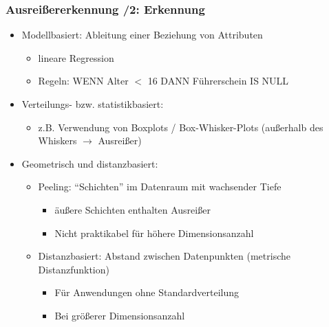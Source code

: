     \begin{frame}
    \frametitle{Ausreißererkennung /2: Erkennung }
    
    \begin{itemize}
    \item Modellbasiert: Ableitung einer Beziehung von Attributen
        \begin{itemize}
        \item lineare Regression
        \item Regeln: WENN Alter $<$ 16 DANN Führerschein IS NULL
        \end{itemize}
    \item Verteilungs- bzw. statistikbasiert: 
        \begin{itemize}
        \item z.B. Verwendung von Boxplots / Box-Whisker-Plots (außerhalb des Whiskers $\rightarrow$ Ausreißer)
        \end{itemize}
    
    \item Geometrisch und distanzbasiert:
    \begin{itemize}
    \item Peeling: "`Schichten"' im Datenraum mit wachsender Tiefe
    \begin{itemize}
    \item äußere Schichten enthalten Ausreißer
    \item Nicht praktikabel für höhere Dimensionsanzahl
    \end{itemize}
    \item Distanzbasiert: Abstand zwischen Datenpunkten (metrische
      Distanzfunktion) 
    \begin{itemize}
    \item Für Anwendungen ohne Standardverteilung
    \item Bei größerer Dimensionsanzahl
    \end{itemize}
    \end{itemize}
    \end{itemize}
    
    
    \end{frame}
    
    
